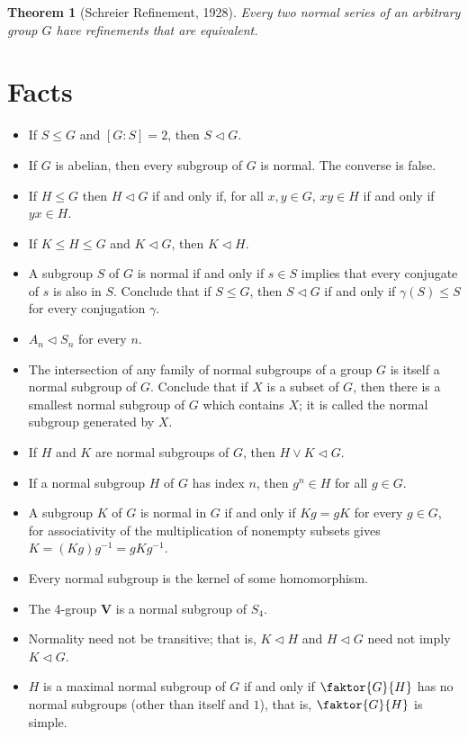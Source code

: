 \documentclass[12pt]{report}
\newtheorem{theorem}{Theorem}[chapter]
\theoremstyle{definition}
\begin{document}
\begin{theorem}[Schreier Refinement, 1928]
	Every two normal series of an arbitrary group $G$ have refinements that are equivalent.
\end{theorem}



\section{Facts}
\begin{itemize}
	\item If $S\leq G$ and $[G:S]=2$, then $S\vartriangleleft G$.
	\item If $G$ is abelian, then every subgroup of $G$ is normal. The converse is false.
	\item If $H\leq G$ then $H\vartriangleleft G$ if and only if, for all $x,y\in G$, $xy\in H$ if and only if $yx\in H$.
	\item If $K\leq H\leq G$ and $K\vartriangleleft G$, then $K\vartriangleleft H$.
	\item A subgroup $S$ of $G$ is normal if and only if $s\in S$ implies that every conjugate of $s$ is also in $S$. Conclude that if $S\leq G$, then $S\vartriangleleft G$ if and only if $\gamma(S)\leq S$ for every conjugation $\gamma$.
	\item $A_n\vartriangleleft S_n$ for every $n$.
	\item The intersection of any family of normal subgroups of a group $G$ is itself a normal subgroup of $G$. Conclude that if $X$ is a subset of $G$, then there is a smallest normal subgroup of $G$ which contains $X$; it is called the normal subgroup generated by $X$.
	\item If $H$ and $K$ are normal subgroups of $G$, then $H\vee K\vartriangleleft G$.
	\item If a normal subgroup $H$ of $G$ has index $n$, then $g^n\in H$ for all $g\in G$.
	\item A subgroup $K$ of $G$ is normal in $G$ if and only if $Kg = gK$ for every $g\in G$, for associativity of the multiplication of nonempty subsets gives $K = (Kg)g^{-1} = gKg^{-1}$.
	\item Every normal subgroup is the kernel of some homomorphism.
	\item The 4-group $\mathbf{V}$ is a normal subgroup of $S_4$.
	\item Normality need not be transitive; that is, $K\vartriangleleft H$ and $H\vartriangleleft G$ need not imply $K\vartriangleleft G$.
	\item $H$ is a maximal normal subgroup of $G$ if and only if $\faktor{G}{H}$ has no normal subgroups (other than itself and $1$), that is, $\faktor{G}{H}$ is simple.

\end{itemize}
\end{document}
